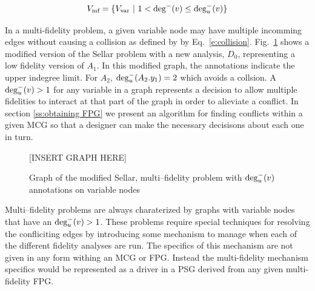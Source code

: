   \begin{equation}
    V_{\textrm{mf}} = \{ V_{\textrm{var}} \ | \  1 < \textrm{deg}^-(v) \leq \textrm{deg}^-_u(v) \}
  \end{equation}

  In a multi-fidelity problem, a given variable node may have multiple incomming 
  edges without causing a collision as defined by by Eq.~\ref{e:collision}. 
  Fig.~\ref{f:collision_example} shows a modified version of the Sellar problem 
  with a new analysis, $D_0$, representing a low fidelity version of $A_1$. 
  In this modified graph, the annotations indicate the upper indegree limit. For 
  $A_2$, $\textrm{deg}^-_u(A_2.y_1) = 2$ which avoids a collsion. A  
  $\textrm{deg}^-_u(v) > 1$ for any variable in a graph represents a decision to 
  allow multiple fidelities to interact at that part of the graph in order to alieviate
  a conflict. In section \ref{ss:obtaining FPG} we present an algorithm for finding 
  conflicts within a given MCG so that a designer can make the necessary decisisons about each 
  one in turn. 

  \begin{figure}
    \begin{center}
    [INSERT GRAPH HERE]
    \caption{Graph of the modified Sellar, multi--fidelity problem with $\textrm{deg}^-_u(v)$ annotations on variable nodes\label{f:collision_example}}
  \end{center}
  \end{figure}

  Multi--fidelity problems are always charaterized by graphs with variable 
  nodes that have an $\textrm{deg}^-_u(v) > 1$. These problems require 
  special techniques for resolving the confliciting edges by introducing some mechanism
  to manage when each of the different fidelity analyses are 
  run\cite{march2012provably,alexandrov2001approximation,Huang_Allen_Notz_Miller_2006}.
  The specifics of this mechanism are not given in any form withing an MCG or 
  FPG. Instead the multi-fidelity mechanism specifics would be represented as a 
  driver in a PSG derived from any given multi-fidelity FPG. 


